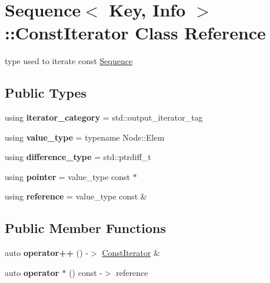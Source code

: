 \hypertarget{structSequence_1_1ConstIterator}{}\section{Sequence$<$ Key, Info $>$\+::Const\+Iterator Class Reference}
\label{structSequence_1_1ConstIterator}


type used to iterate const \mbox{\hyperlink{structSequence}{Sequence}}  


\subsection*{Public Types}
\begin{DoxyCompactItemize}
\item 
\mbox{\label{structSequence_1_1ConstIterator_ac22214d3a87fed01c210dd8dd33c091d}} 
using {\bfseries iterator\+\_\+category} = std\+::output\+\_\+iterator\+\_\+tag
\item 
\mbox{\label{structSequence_1_1ConstIterator_a9a87d07a3cf018cd447d8fb320ad2ac2}} 
using {\bfseries value\+\_\+type} = typename Node\+::\+Elem
\item 
\mbox{\label{structSequence_1_1ConstIterator_a0e873bd85328bea053b14d7370106e30}} 
using {\bfseries difference\+\_\+type} = std\+::ptrdiff\+\_\+t
\item 
\mbox{\label{structSequence_1_1ConstIterator_a35d35facfdecbd526f6e4803c62e9a8d}} 
using {\bfseries pointer} = value\+\_\+type const  $\ast$
\item 
\mbox{\label{structSequence_1_1ConstIterator_a081fb2eaa0c3aada606ea91a58953bb0}} 
using {\bfseries reference} = value\+\_\+type const  \&
\end{DoxyCompactItemize}
\subsection*{Public Member Functions}
\begin{DoxyCompactItemize}
\item 
\mbox{\label{structSequence_1_1ConstIterator_a9bca5377341285e8d0b4e575bbe8485e}} 
auto {\bfseries operator++} () -\/$>$ \mbox{\hyperlink{structSequence_1_1ConstIterator}{Const\+Iterator}} \&
\item 
\mbox{\label{structSequence_1_1ConstIterator_af4918f4f360de1b327d46c14a5945715}} 
auto {\bfseries operator $\ast$} () const -\/$>$ reference
\end{DoxyCompactItemize}

